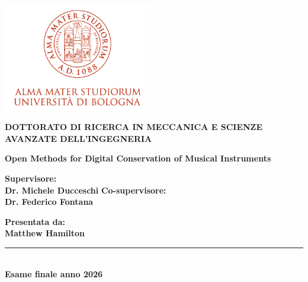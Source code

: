 \begin{titlepage}

\begin{center}

\includegraphics[width=6.5cm,height=4.7cm]{img/logo/marchio-di-ateneo.png}

\vspace{10mm}

{\Large{\bf{DOTTORATO DI RICERCA IN
MECCANICA E SCIENZE AVANZATE DELL'INGEGNERIA}}}

\vspace{15mm}

{\huge{\bf Open Methods for Digital Conservation of Musical Instruments }}\\
\vspace{3mm}

\end{center}

\vspace{10mm}

\begin{minipage}[t]{0.40\textwidth}
{\Large{\bf Supervisore: \\ Dr. Michele Ducceschi}}
\vspace{3mm}
{\Large{\bf Co-supervisore: \\ Dr. Federico Fontana }}
\end{minipage}
\hfill
\begin{minipage}[t]{0.40\textwidth}\raggedleft
{\Large{\bf Presentata da: \\ Matthew Hamilton}}
\end{minipage}


\vspace{8cm}

\begin{center}
\rule[0.0cm]{\linewidth}{0.1mm}\\
{\large{\bf Esame finale anno 2026 \\}}
\end{center}

\end{titlepage}